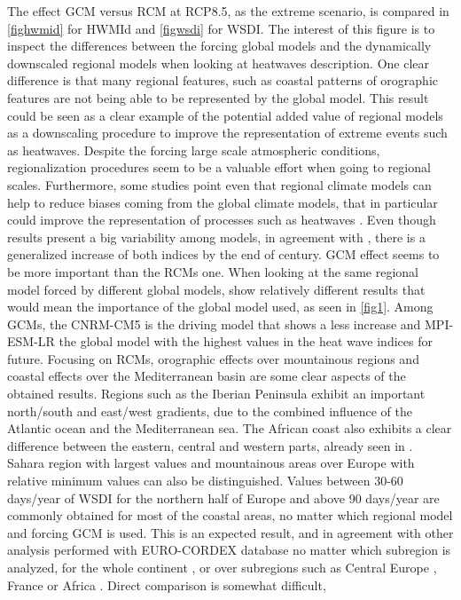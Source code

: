 The effect GCM versus RCM at RCP8.5, as the extreme scenario, is compared in \ref{fighwmid} for HWMId and \ref{figwsdi} for WSDI. The interest of this figure is to inspect the differences between
the forcing global models and the dynamically downscaled regional models when
looking at heatwaves description. One clear difference is that many regional features, such as coastal patterns
of orographic features are not being able to be represented by the global model.
This result could be seen as a clear example of the potential added value of
regional models as a downscaling procedure to improve the representation of extreme
events such as heatwaves. Despite the forcing large scale atmospheric
conditions, regionalization procedures seem to be a valuable effort when going
to regional scales. Furthermore, some studies point even that regional climate
models can help to reduce biases coming from the global climate models, that
in particular could improve the representation of processes such as heatwaves \cite{sor_al2018}.
Even though results present a big variability among models, in agreement with \cite{vau_al2013}, there is a generalized increase of both indices by the end of century. GCM effect seems to be more important than the RCMs one. When looking at the same regional model forced by different global models, show relatively different results that would mean the importance of the global model used, as seen in \ref{fig1}. 
Among GCMs, the CNRM-CM5 is the driving model that shows a less increase and MPI-ESM-LR the global model with the highest values in the heat wave indices for future. 
Focusing on RCMs, orographic effects over mountainous regions and coastal effects over the Mediterranean basin \cite{Car_al2019} are some clear aspects of the obtained results. Regions such as the Iberian Peninsula exhibit an important north/south 
and east/west gradients, due to the combined influence  of the Atlantic ocean and
the Mediterranean sea. The African coast also exhibits a clear difference between the eastern, central and western parts, already seen in \cite{dos2017}. Sahara region with largest values and mountainous
areas over Europe with relative minimum values can also be distinguished. 
Values between 30-60 days/year of WSDI for the northern half
of Europe and above 90 days/year are commonly obtained for most of the coastal
areas, no matter which regional model and forcing GCM is used. This is an expected result, and in agreement with other analysis performed
with EURO-CORDEX database no matter which subregion is analyzed, for the whole continent \cite{jac_al2014}, or over subregions such as Central Europe \cite{lho_al2018},  France \cite{ouz_al2016} or Africa \cite{dos2017}. Direct comparison is somewhat difficult,
